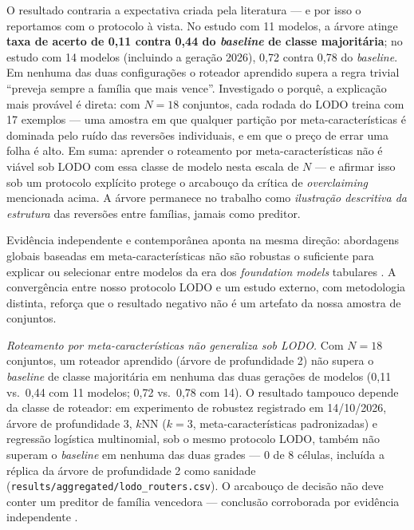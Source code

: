 O resultado contraria a expectativa criada pela literatura --- e por
isso o reportamos com o protocolo à vista. No estudo com 11 modelos, a árvore atinge \textbf{taxa de acerto de 0,11 contra
0,44 do \emph{baseline} de classe majoritária}; no estudo com 14 modelos
(incluindo a geração 2026), 0,72 contra 0,78 do \emph{baseline}. Em nenhuma
das duas configurações o roteador aprendido supera a regra trivial
``preveja sempre a família que mais vence''. Investigado o porquê, a
explicação mais provável é direta: com $N{=}18$ conjuntos, cada rodada do LODO
treina com 17 exemplos --- uma amostra em que qualquer partição por
meta-características é dominada pelo ruído das reversões individuais, e em
que o preço de errar uma folha é alto. Em suma:
aprender o roteamento por meta-características não é viável sob LODO com essa
classe de modelo nesta escala de $N$ --- e afirmar isso sob um protocolo
explícito protege o arcabouço da crítica de \emph{overclaiming}
mencionada acima. A árvore permanece no trabalho como \emph{ilustração
descritiva da estrutura} das reversões entre famílias, jamais como
preditor.

Evidência independente e contemporânea aponta na mesma direção:
abordagens globais baseadas em meta-características não são robustas o
suficiente para explicar ou selecionar entre modelos da era dos
\emph{foundation models} tabulares \citep{herre2026}. A convergência entre
nosso protocolo LODO e um estudo externo, com metodologia distinta,
reforça que o resultado negativo não é um artefato da nossa amostra de
conjuntos.

\emph{Roteamento por meta-características não generaliza sob LODO.}
Com $N{=}18$ conjuntos, um roteador aprendido (árvore de profundidade
2) não supera o \emph{baseline} de classe majoritária em nenhuma das duas
gerações de modelos (0,11 vs.\ 0,44 com 11 modelos; 0,72 vs.\ 0,78 com
14). O resultado tampouco depende da classe de roteador: em experimento
de robustez registrado em 14/10/2026, árvore de profundidade 3,
$k$NN ($k{=}3$, meta-características padronizadas) e regressão
logística multinomial, sob o mesmo protocolo LODO, também não superam o
\emph{baseline} em nenhuma das duas grades --- 0 de 8 células,
incluída a réplica da árvore de profundidade 2 como sanidade
(\texttt{results/\allowbreak aggregated/\allowbreak lodo\_\allowbreak routers.\allowbreak csv}). O arcabouço de decisão
não deve conter um preditor de família vencedora --- conclusão
corroborada por evidência independente \citep{herre2026}.

